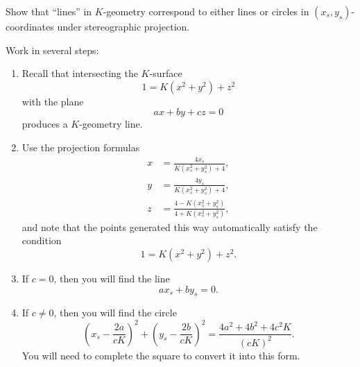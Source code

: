\documentclass[newpage,hints,12pt,noauthor,nooutcomes]{ximera}
\begin{document}
\begin{problem}
  Show that ``lines'' in $K$-geometry correspond to either lines or circles in
  $(x_{s},y_{s})$-coordinates under stereographic projection.

  \begin{hint}
    Work in several steps:
\begin{enumerate}
\item Recall that intersecting the $K$-surface
  \[
  1 = K\left(x^2+y^2\right) + z^2 
  \]
  with the plane
  \[
  ax+by+cz = 0
  \]
  produces a $K$-geometry line.
\item Use the projection formulas
  \begin{align*}
      x &= \frac{4x_s}{K(x_s^2 + y_s^2) + 4},\\
      y &= \frac{4y_s}{K(x_s^2 + y_s^2) + 4},\\
      z &= \frac{4-K(x_s^2 + y_s^2)}{4+K(x_s^2 + y_s^2)},
  \end{align*}
  and note that the points generated this way automatically satisfy the condition
  \[
  1 = K(x^2+y^2) + z^2.
  \]
\item If $c=0$, then you will find the line
  \[
   ax_s + by_s = 0.
  \]
\item If $c\ne 0$, then you will find the circle
  \[
   \left(x_s - \frac{2a}{cK}\right)^2 + \left(y_s -
   \frac{2b}{cK}\right)^2 = \frac{4a^2 + 4b^2 + 4c^2K}{(cK)^2}.
   \]
   You will need to complete the square to convert it into this form.
\end{enumerate}
\end{hint}


\end{problem}
\end{document}
